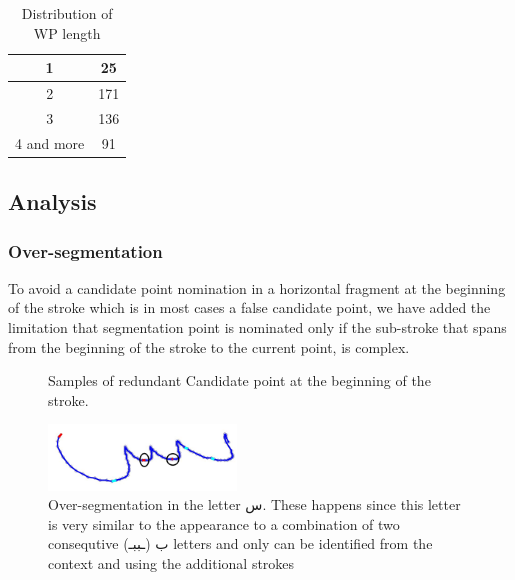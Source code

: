 \documentclass[12pt,journal,compsoc]{IEEEtran}
\begin{document}
\begin{table}[h]
\caption{Distribution of WP length}
\begin{tabular}{ | c | c | }
  \hline                     
    1 & 25 \\ 
  \hline
  2 &  171 \\ 
 \hline
 3 & 136 \\ 
 \hline
  4 and more & 91 \\
\hline
\end{tabular}
\centering
\label{table:wp_length_dist} 
\end{table}

\subsection{Analysis}

\subsubsection{Over-segmentation}

To avoid a candidate point nomination in a horizontal fragment at the beginning of the stroke which is in most cases a false candidate point, we have added the limitation that segmentation point is nominated only if the sub-stroke that spans from the beginning of the stroke to the current point, is complex.
\begin{figure}[h]
\centering
    \caption{Samples of redundant Candidate point at the beginning of the  stroke.}
   \label{fig:oversegmentation_begin}
\end{figure}

\begin{figure}[h]
\centering
\includegraphics[width=5cm]{./figures/oversegmentation_s}
\caption{Over-segmentation in the letter س. These happens since this letter is very similar to the appearance to a combination of two consequtive ب (ـببـ) letters and only can be identified from the context and using the additional strokes }
\label{fig:oversegmentation_s}
\end{figure}
\end{document}
